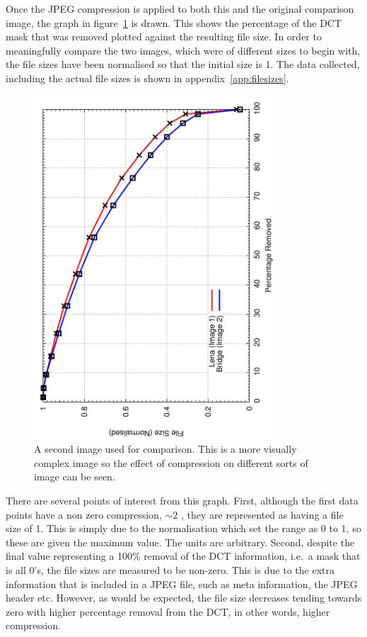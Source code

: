 		Once the JPEG compression is applied to both this and the original comparison image, the graph in figure~\ref{fig:comparason_graph} is drawn. This shows the percentage of the DCT mask that was removed plotted against the resulting file size. In order to meaningfully compare the two images, which were of different sizes to begin with, the file sizes have been normalised so that the initial size is 1. The data collected, including the actual file sizes is shown in appendix~\ref{app:filesizes}.
		\begin{figure}[ht]
			\centering
			\includegraphics[angle=270,width=0.8\textwidth]{comparason_graph2.pdf}
			\caption{A second image used for comparison. This is a more visually complex image so the effect of compression on different sorts of image can be seen.\label{fig:comparason_graph}}
		\end{figure}

		There are several points of interest from this graph. First, although the first data points have a non zero compression, $\sim2$ , they are represented as having a file size of 1. This is simply due to the normalisation which set the range as 0 to 1, so these are given the maximum value. The units are arbitrary. Second, despite the final value representing a 100\% removal of the DCT information, i.e.\ a mask that is all 0's, the file sizes are measured to be non-zero. This is due to the extra information that is included in a JPEG file, such as meta information, the JPEG header etc. However, as would be expected, the file size decreases tending towards zero with higher percentage removal from the DCT, in other words, higher compression.

